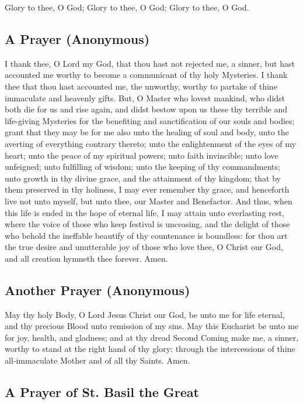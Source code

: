     Glory to thee, O God; Glory to thee, O God; Glory to thee, O God.

\subsection{A Prayer (Anonymous)}

    I thank thee, O Lord my God, that thou hast not rejected me, a sinner, but hast accounted me worthy to become a communicant of thy holy Mysteries. I thank thee that thou hast accounted me, the unworthy, worthy to partake of thine immaculate and heavenly gifts. But, O Master who lovest mankind, who didst both die for us and rise again, and didst bestow upon us these thy terrible and life-giving Mysteries for the benefiting and sanctification of our souls and bodies; grant that they may be for me also unto the healing of soul and body, unto the averting of everything contrary thereto; unto the enlightenment of the eyes of my heart; unto the peace of my spiritual powers; unto faith invincible; unto love unfeigned; unto fulfilling of wisdom; unto the keeping of thy commandments; unto growth in thy divine grace, and the attainment of thy kingdom; that by them preserved in thy holiness, I may ever remember thy grace, and henceforth live not unto myself, but unto thee, our Master and Benefactor. And thus, when this life is ended in the hope of eternal life, I may attain unto everlasting rest, where the voice of those who keep festival is unceasing, and the delight of those who behold the ineffable beautify of thy countenance is boundless: for thou art the true desire and unutterable joy of those who love thee, O Christ our God, and all creation hymneth thee forever. Amen.
    
\subsection{Another Prayer (Anonymous)}

    May thy holy Body, O Lord Jesus Christ our God, be unto me for life eternal, and thy precious Blood unto remission of my sins. May this Eucharist be unto me for joy, health, and gladness; and at thy dread Second Coming make me, a sinner, worthy to stand at the right hand of thy glory: through the intercessions of thine all-immaculate Mother and of all thy Saints.  Amen.

\subsection{A Prayer of St. Basil the Great}

